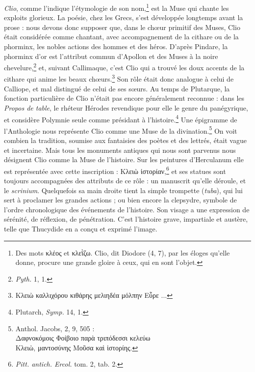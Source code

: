 \documentclass[a4paper, 11pt, oneside, polutonikogreek, french]{article}
\begin{document}
\emph{Clio}, comme l'indique l'étymologie de son nom,\footnote{Des mots κλέος et κλεῒζω. Clio, dit Diodore (4, 7), par les éloges qu'elle donne, procure une grande gloire à ceux, qui en sont l'objet.} est la Muse qui chante les exploits glorieux. La poésie, chez les Grecs, s'est développée longtemps avant la prose : nous devons donc supposer que, dans le chœur primitif des Muses, Clio était considérée comme chantant, avec accompagnement de la cithare ou de la phorminx, les nobles actions des hommes et des héros. D'après Pindare, la phorminx d'or est l'attribut commun d'Apollon et des Muses à la noire chevelure,\footnote{\emph{Pyth.} 1, 1.} et, suivant Callimaque, c'est Clio qui a trouvé les doux accents de la cithare qui anime les beaux chœurs.\footnote{Κλειὼ καλλιχόρου κιθάρης μελιηδέα μόλπην Εὖρε ...} Son rôle était donc analogue à celui de Calliope, et mal distingué de celui de ses sœurs. Au temps de Plutarque, la fonction particulière de Clio n'était pas encore généralement reconnue : dans les \emph{Propos de table}, le rhéteur Hérodes revendique pour elle le genre du panégyrique, et considère Polymnie seule comme présidant à l'histoire.\footnote{Plutarch, \emph{Symp.} 14, 1.} Une épigramme de l'Anthologie nous représente Clio comme une Muse de la divination.\footnote{Anthol. Jacobs, 2, 9, 505 :\\\hspace*{5mm}Δαφνοκόμοις Φοίβοιο παρὰ τριπόδεσσι κελεύω\\\hspace*{5mm}Κλειὼ, μαντοσύνης Μοῦσα καὶ ἱστορίης.} On voit combien la tradition, soumise aux fantaisies des poètes et des lettrés, était vague et incertaine. Mais tous les monuments antiques qui nous sont parvenus nous désignent Clio comme la Muse de l'histoire. Sur les peintures d'Herculanum elle est représentée avec cette inscription : Κλειὼ ἱστορίαν,\footnote{\emph{Pitt. antich. Ercol.} tom. 2, tab. 2.} et ses statues sont toujours accompagnées des attributs de ce rôle : un manuscrit qu'elle déroule, et le \emph{scrinium}. Quelquefois sa main droite tient la simple trompette (\emph{tuba}), qui lui sert à proclamer les grandes actions ; ou bien encore la clepsydre, symbole de l'ordre chronologique des événements de l'histoire. Son visage a une expression de sérénité, de réflexion, de pénétration. C'est l'histoire grave, impartiale et austère, telle que Thucydide en a conçu et exprimé l'image.
\end{document}
